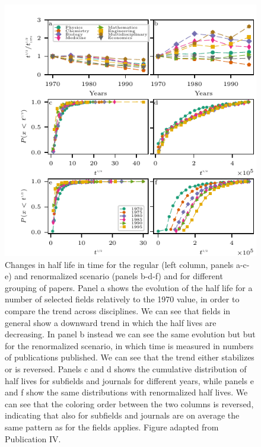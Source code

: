 \begin{figure}[h!]
\centering \large
\includegraphics[width=.8\linewidth]{Figures/multidisciplinarity.pdf}

\caption{Changes in half life in time for the regular (left column, panels a-c-e) and renormalized scenario (panels b-d-f) and for different grouping of papers.
Panel a shows the evolution of the half life for a number of selected fields relatively to the 1970 value, in order to compare the trend across disciplines. We can see that fields
in general show a downward trend in which the half lives are decreasing. In panel b instead we can see the same evolution but but for the renormalized scenario, in which
time is measured in numbers of publications published. We can see that the trend either stabilizes or is reversed. Panels c and d shows the cumulative distribution of half lives for subfields and journals for 
different years, while panels e and f show the same distributions with renormalized half lives. We can see that the coloring order between the two columns is reversed, indicating
that also for subfields and journals are on average the same pattern as for the fields applies. Figure adapted from Publication IV.}
\label{fig:multidisciplinarity}
\end{figure}


